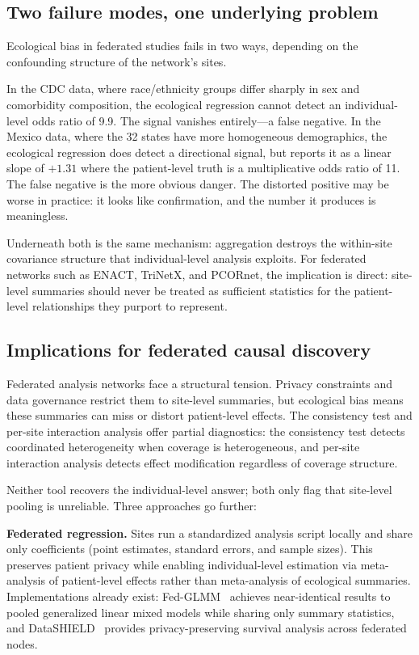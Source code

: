\documentclass{article}
\begin{document}
\subsection{Two failure modes, one underlying problem}

Ecological bias in federated studies fails in two ways, depending on the
confounding structure of the network's sites.

In the CDC data, where race/ethnicity groups differ sharply in sex and
comorbidity composition, the ecological regression cannot detect an
individual-level odds ratio of 9.9.  The signal vanishes entirely---a
false negative.  In the Mexico data, where the 32 states have more
homogeneous demographics, the ecological regression does detect a
directional signal, but reports it as a linear slope of $+1.31$ where the
patient-level truth is a multiplicative odds ratio of 11.  The false
negative is the more obvious danger.  The distorted positive may be worse
in practice: it looks like confirmation, and the number it produces is
meaningless.

Underneath both is the same mechanism: aggregation destroys the within-site
covariance structure that individual-level analysis exploits.  For
federated networks such as ENACT, TriNetX, and PCORnet, the implication
is direct: site-level summaries should never be treated as sufficient
statistics for the patient-level relationships they purport to represent.

\subsection{Implications for federated causal discovery}

Federated analysis networks face a structural tension.  Privacy
constraints and data governance restrict them to site-level summaries, but
ecological bias means these summaries can miss or distort patient-level
effects.  The consistency test and per-site interaction
analysis offer partial diagnostics: the consistency test detects
coordinated heterogeneity when coverage is heterogeneous, and per-site
interaction analysis detects effect modification regardless of coverage
structure.

Neither tool recovers the individual-level answer; both only flag that
site-level pooling is unreliable.  Three approaches go further:

\textbf{Federated regression.}  Sites run a standardized analysis script
locally and share only coefficients (point estimates, standard errors, and
sample sizes).  This preserves patient privacy while enabling
individual-level estimation via meta-analysis of patient-level effects
rather than meta-analysis of ecological summaries.  Implementations already
exist: Fed-GLMM~\cite{chen2023fedglmm} achieves near-identical results to
pooled generalized linear mixed models while sharing only summary statistics,
and DataSHIELD~\cite{wilson2022datashield} provides privacy-preserving
survival analysis across federated nodes.
\end{document}
